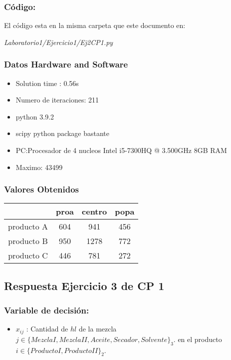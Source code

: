 \documentclass[]{article}
\begin{document}
\subsubsection*{C\'odigo:}

El c\'odigo esta en la misma carpeta que este documento en:

 \textit{ Laboratorio1/Ejercicio1/Ej2CP1.py}

\subsubsection*{Datos Hardware and Software}
\begin{itemize}
\item Solution time  :   0.56s
\item Numero de iteraciones: 211
\item python 3.9.2  
\item scipy python package bastante 
\item PC:Procesador de 4 nucleos Intel i5-7300HQ @ 3.500GHz 8GB RAM
\item Maximo: 43499
\end{itemize}

\subsubsection*{Valores Obtenidos }

\begin{center}
	\begin{tabular}{|c|c|c|c|}
		\hline
		& proa & centro & popa \\\hline
		producto A & 604 & 941 & 456 \\ \hline
		producto B & 950 & 1278 & 772 \\ \hline
		producto C & 446 & 781 & 272 \\ \hline
		\hline
	\end{tabular}
\end{center}
\subsection*{Respuesta Ejercicio 3 de CP 1}

\subsubsection*{Variable de decisi\'on:}

\begin{itemize}
	\item $x_{ij}$ : Cantidad de $hl$ de la mezcla $j \in \{Mezcla I,Mezcla II,Aceite,Secador,Solvente\}_3$. en el producto $i\in \{Producto I,Producto II\}_2$.
\end{itemize}
\end{document}
